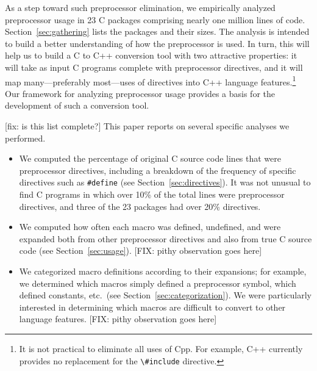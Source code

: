 As a step toward such preprocessor elimination, we empirically analyzed
preprocessor usage in 23 C packages comprising nearly one million lines of
code.  Section~\ref{sec:gathering} lists the packages and their sizes.  The
analysis is intended to build a better understanding of how the
preprocessor is used.  In turn, this will help us to build a C to C++
conversion tool with two attractive properties: it will take as input C
programs complete with preprocessor directives, and it will map
many---preferably most---uses of directives into C++ language
features.\footnote{It is not practical to eliminate all uses of Cpp.  For
  example, C++ currently provides no replacement for the \verb+\#include+
  directive.} Our framework for analyzing preprocessor usage provides a
basis for the development of such a conversion tool.

[fix: is this list complete?]
This paper reports on several specific analyses we performed.
\begin{itemize}\itemsep 0pt \parskip 0pt

\item We computed the percentage of original C source code lines that
were preprocessor directives, including a breakdown of the frequency
of specific directives such as \verb+#define+ (see
Section~\ref{sec:directives}). It was not unusual to find C programs 
in which over 10\% of the total lines were preprocessor directives, and 
three of the 23 packages had over 20\% directives.

\item We computed how often each macro was
defined,  undefined, and
were expanded both from other preprocessor directives and also from
true C source code (see Section~\ref{sec:usage}).
[FIX: pithy observation goes here]

\item We categorized macro definitions according to their expansions; 
      for example, we determined which macros simply
      defined a preprocessor symbol, which defined constants, etc.~(see
      Section~\ref{sec:categorization}).  We
      were particularly interested in determining which macros are
      difficult to convert to other language
      features.  [FIX: pithy observation goes here]

\end{itemize}

